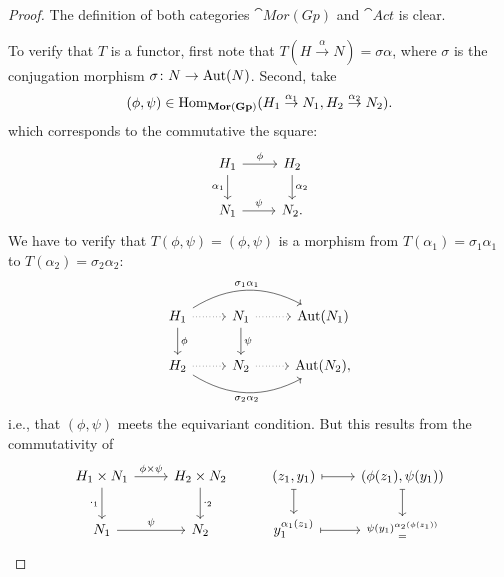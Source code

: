 \begin{proof}
    The definition of both categories $\cat{Mor(Gp)}$ and $\cat{Act}$ is clear.
    
    To verify that $T$ is a functor, first note that $T(H\stackrel\alpha\to N)=\sigma\alpha$, where $\sigma$ is the conjugation morphism $\sigma\colon N\to{\rm Aut}(N)$. Second, take 
    $$
        (\phi,\psi)\in{\rm Hom}_{\mathbf{Mor(Gp)}}
            (H_1\stackrel{\alpha_1}\to N_1, H_2\stackrel{\alpha_2}\to N_2).
    $$
    which corresponds to the commutative the square:
    $$
        \begin{tikzcd}
            H_1
                    \arrow[r,"\phi"]
                    \arrow[d,"\alpha_1"']
                &H_2
                    \arrow[d,"\alpha_2"]\\
            N_1
                    \arrow[r,"\psi"]
                &N_2.
        \end{tikzcd}
    $$
    We have to verify that $T(\phi,\psi)=(\phi,\psi)$ is a morphism from $T(\alpha_1)=\sigma_1\alpha_1$ to $T(\alpha_2)=\sigma_2\alpha_2$:
    $$
        \begin{tikzcd}
            H_1
                    \arrow[r,dotted]
                    \arrow[d,"\phi"]
                    \arrow[rr,"\sigma_1\alpha_1",bend left]
                &N_1
                    \arrow[r,dotted]
                    \arrow[d,"\psi"]
                &\Aut(N_1)\\
            H_2
                    \arrow[r,dotted]
                    \arrow[rr,"\sigma_2\alpha_2"',bend right]
                &N_2
                    \arrow[r,dotted]
                &\Aut(N_2),
        \end{tikzcd}
    $$
    i.e., that $(\phi,\psi)$ meets the equivariant condition. But this results from the commutativity of
    $$
        \begin{tikzcd}
            H_1\times N_1
                    \arrow[r,"\phi\times\psi"]
                    \arrow[d,"\cdot_1"']
                &H_2\times N_2
                    \arrow[d,"\cdot_2"]
                &{(z_1,y_1)}
                    \arrow[r,mapsto]
                    \arrow[d,mapsto]
                &{(\phi(z_1),\psi(y_1))}\arrow[d,mapsto]\\
            N_1
                    \arrow[r,"\psi"]
                &N_2
                &y_1^{\alpha_1(z_1)}
                    \arrow[r,mapsto]
                &\substack{\psi(y_1)^{\alpha_2(\phi(z_1))}\\
                    =\\
}
\end{tikzcd}$$
\end{proof}
